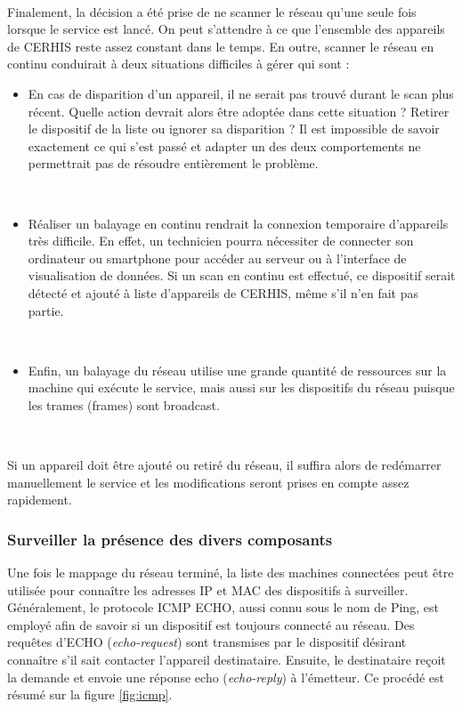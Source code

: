 ~

\noindent
Finalement, la décision a été prise de ne scanner le réseau qu'une seule fois lorsque le service est lancé. On peut s’attendre à ce que l’ensemble des appareils de CERHIS reste assez constant dans le temps. En outre, scanner le réseau en continu conduirait à deux situations difficiles à gérer qui sont :
\begin{itemize}
  \item En cas de disparition d’un appareil, il ne serait pas trouvé durant le scan plus récent. Quelle action devrait alors être adoptée dans cette situation ? Retirer le dispositif de la liste ou ignorer sa disparition ? Il est impossible de savoir exactement ce qui s’est passé et adapter un des deux comportements ne permettrait pas de résoudre entièrement le problème.

  ~

  \item Réaliser un balayage en continu rendrait la connexion temporaire d’appareils très difficile. En effet, un technicien pourra nécessiter de connecter son ordinateur ou smartphone pour accéder au serveur ou à l’interface de visualisation de données. Si un scan en continu est effectué, ce dispositif serait détecté et ajouté à liste d’appareils de CERHIS, même s’il n’en fait pas partie.

  ~

  \item 	Enfin, un balayage du réseau utilise une grande quantité de ressources sur la machine qui exécute le service, mais aussi sur les dispositifs du réseau puisque les trames (frames) sont broadcast.
\end{itemize}

~

\noindent
Si un appareil doit être ajouté ou retiré du réseau, il suffira alors de redémarrer manuellement le service et les modifications seront prises en compte assez rapidement.


\subsubsection{Surveiller la présence des divers composants}

\noindent
Une fois le mappage du réseau terminé, la liste des machines connectées peut être utilisée pour connaître les adresses IP et MAC des dispositifs à surveiller. Généralement, le protocole ICMP ECHO, aussi connu sous le nom de Ping, est employé afin de savoir si un dispositif est toujours connecté au réseau. Des requêtes d’ECHO (\textit{echo-request}) sont transmises par le dispositif désirant connaître s’il sait contacter l’appareil destinataire. Ensuite, le destinataire reçoit la demande et envoie une réponse echo (\textit{echo-reply}) à l’émetteur. Ce procédé est résumé sur la figure \ref{fig:icmp}.


